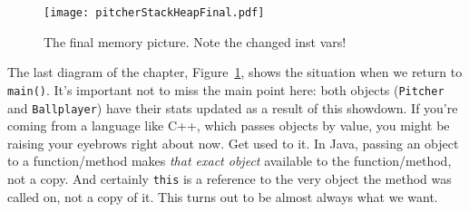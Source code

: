 \begin{figure}[ht]
\centering
\texttt{[image: pitcherStackHeapFinal.pdf]}  %
\caption{The final memory picture. Note the changed inst vars!}
\label{fig:pitcherStackHeapFinal}
\end{figure}

The last diagram of the chapter, Figure~\ref{fig:pitcherStackHeapFinal}, shows
the situation when we return to \texttt{main()}. It's important not to miss
the main point here: both objects (\texttt{Pitcher} and \texttt{Ballplayer})
have their stats updated as a result of this showdown. If you're coming from a
language like C++, which passes objects by value, you might be raising your
eyebrows right about now. Get used to it. In Java, passing an object to a
function/method makes \textit{that exact object} available to the
function/method, not a copy. And certainly \texttt{this} is a reference to the
very object the method was called on, not a copy of it. This turns out to be
almost always what we want.


